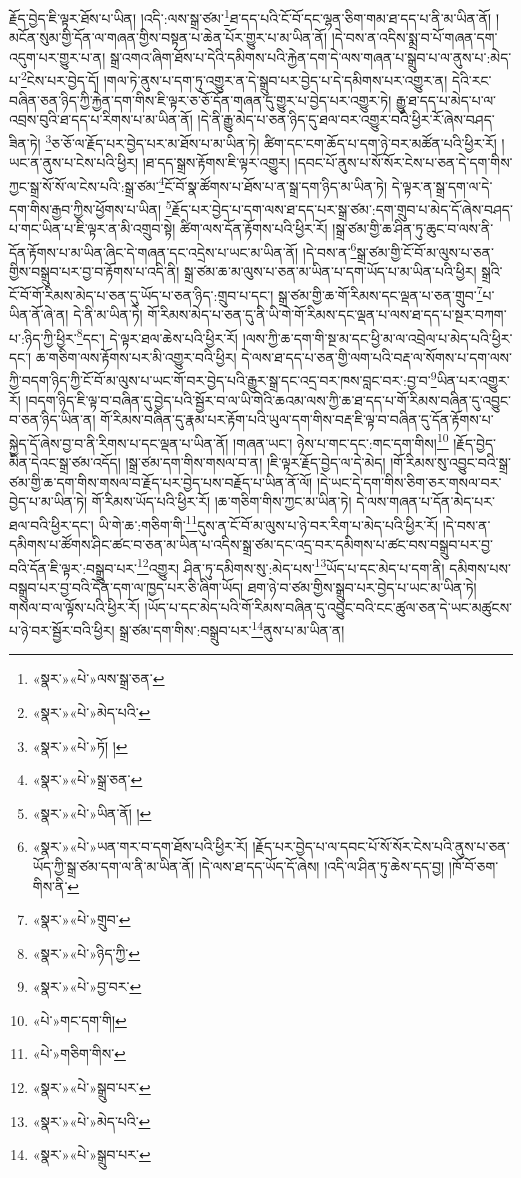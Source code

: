 རྗོད་བྱེད་ཇི་ལྟར་ཐོས་པ་ཡིན། །འདི་:ལས་སྒྲ་ཙམ་\footnote{«སྣར་»«པེ་»ལས་སྒྲ་ཅན་}ཐ་དད་པའི་ངོ་བོ་དང་ལྷན་ཅིག་གམ་ཐ་དད་པ་ནི་མ་ཡིན་ནོ། །མངོན་སུམ་གྱི་དོན་ལ་གཞན་གྱིས་བསྟན་པ་ཆེན་པོར་གྱུར་པ་མ་ཡིན་ནོ། །དེ་བས་ན་འདིས་སྨྲ་བ་པོ་གཞན་དག་འདུག་པར་གྱུར་པ་ན། སྒྲ་འགའ་ཞིག་ཐོས་པ་དེའི་དམིགས་པའི་རྐྱེན་དག་དེ་ལས་གཞན་པ་སྒྲུབ་པ་ལ་ནུས་པ་:མེད་པ་\footnote{«སྣར་»«པེ་»མེད་པའི་}ངེས་པར་བྱེད་དོ། །གལ་ཏེ་ནུས་པ་དག་ཏུ་འགྱུར་ན་དེ་སྒྲུབ་པར་བྱེད་པ་དེ་དམིགས་པར་འགྱུར་ན། དེའི་རང་བཞིན་ཅན་ཉིད་ཀྱི་རྐྱེན་དག་གིས་ཇི་ལྟར་ཅ་ཅོ་དོན་གཞན་དུ་གྱུར་པ་བྱེད་པར་འགྱུར་ཏེ། རྒྱུ་ཐ་དད་པ་མེད་པ་ལ་འབྲས་བུའི་ཐ་དད་པ་རིགས་པ་མ་ཡིན་ནོ། །དེ་ནི་རྒྱུ་མེད་པ་ཅན་ཉིད་དུ་ཐལ་བར་འགྱུར་བའི་ཕྱིར་རོ་ཞེས་བཤད་ཟིན་ཏེ། \footnote{«སྣར་»«པེ་»ཏོ། ། }ཅ་ཅོ་ལ་རྗོད་པར་བྱེད་པར་མ་ཐོས་པ་མ་ཡིན་ཏེ། ཚིག་དང་ངག་ཆོད་པ་དག་ཉེ་བར་མཚོན་པའི་ཕྱིར་རོ། །ཡང་ན་ནུས་པ་ངེས་པའི་ཕྱིར། །ཐ་དད་སྒྲས་རྟོགས་ཇི་ལྟར་འགྱུར། །དབང་པོ་ནུས་པ་སོ་སོར་ངེས་པ་ཅན་དེ་དག་གིས་ཀྱང་སྒྲ་སོ་སོ་ལ་ངེས་པའི་:སྒྲ་ཙམ་\footnote{«སྣར་»«པེ་»སྒྲ་ཅན་}ངོ་བོ་སྣ་ཚོགས་པ་ཐོས་པ་ན་སྒྲ་དག་ཉིད་མ་ཡིན་ཏེ། དེ་ལྟར་ན་སྒྲ་དག་ལ་དེ་དག་གིས་རྒྱབ་ཀྱིས་ཕྱོགས་པ་ཡིན། \footnote{«སྣར་»«པེ་»ཡིན་ནོ། ། }རྗོད་པར་བྱེད་པ་དག་ལས་ཐ་དད་པར་སྒྲ་ཙམ་:དག་གྲུབ་པ་མེད་དོ་ཞེས་བཤད་པ་གང་ཡིན་པ་ཇི་ལྟར་ན་མི་འགྲུབ་སྟེ། ཚིག་ལས་དོན་རྟོགས་པའི་ཕྱིར་རོ། །སྒྲ་ཙམ་གྱི་ཆ་ཤིན་ཏུ་ཆུང་བ་ལས་ནི་དོན་རྟོགས་པ་མ་ཡིན་ཞིང་དེ་གཞན་དང་འདྲེས་པ་ཡང་མ་ཡིན་ནོ། །དེ་བས་ན་\footnote{«སྣར་»«པེ་»ཡན་གར་བ་དག་ཐོས་པའི་ཕྱིར་རོ། །རྗོད་པར་བྱེད་པ་ལ་དབང་པོ་སོ་སོར་ངེས་པའི་ནུས་པ་ཅན་ཡོད་ཀྱི་སྒྲ་ཙམ་དག་ལ་ནི་མ་ཡིན་ནོ། །དེ་ལས་ཐ་དད་ཡོད་དོ་ཞེས། །འདི་ལ་ཤིན་ཏུ་ཆེས་དད་བྱ། །ཁོ་བོ་ཅག་གིས་ནི་}སྒྲ་ཙམ་གྱི་ངོ་བོ་མ་ལུས་པ་ཅན་གྱིས་བསྒྲུབ་པར་བྱ་བ་རྟོགས་པ་འདི་ནི། སྒྲ་ཙམ་ཆ་མ་ལུས་པ་ཅན་མ་ཡིན་པ་དག་ཡོད་པ་མ་ཡིན་པའི་ཕྱིར། སྒྲའི་ངོ་བོ་གོ་རིམས་མེད་པ་ཅན་དུ་ཡོད་པ་ཅན་ཉིད་:གྲུབ་པ་དང་། སྒྲ་ཙམ་གྱི་ཆ་གོ་རིམས་དང་ལྡན་པ་ཅན་གྲུབ་\footnote{«སྣར་»«པེ་»གྲུབ་}པ་ཡིན་ནོ་ཞེ་ན། དེ་ནི་མ་ཡིན་ཏེ། གོ་རིམས་མེད་པ་ཅན་དུ་ནི་ཡི་གེ་གོ་རིམས་དང་ལྡན་པ་ལས་ཐ་དད་པ་སྔར་བཀག་པ་:ཉིད་ཀྱི་ཕྱིར་\footnote{«སྣར་»«པེ་»ཉིད་ཀྱི་}དང་། དེ་ལྟར་ཐལ་ཆེས་པའི་ཕྱིར་རོ། །ལས་ཀྱི་ཆ་དག་གི་སྔ་མ་དང་ཕྱི་མ་ལ་འབྲེལ་པ་མེད་པའི་ཕྱིར་དང་། ཆ་གཅིག་ལས་རྟོགས་པར་མི་འགྱུར་བའི་ཕྱིར། དེ་ལས་ཐ་དད་པ་ཅན་གྱི་ལག་པའི་བརྡ་ལ་སོགས་པ་དག་ལས་ཀྱི་བདག་ཉིད་ཀྱི་ངོ་བོ་མ་ལུས་པ་ཡང་གོ་བར་བྱེད་པའི་རྒྱུར་སྒྲ་དང་འདྲ་བར་ཁས་བླང་བར་:བྱ་བ་\footnote{«སྣར་»«པེ་»བྱ་བར་}ཡིན་པར་འགྱུར་རོ། །བདག་ཉིད་ཇི་ལྟ་བ་བཞིན་དུ་བྱེད་པའི་སྦྱོར་བ་ལ་ཡི་གེའི་ཆའམ་ལས་ཀྱི་ཆ་ཐ་དད་པ་གོ་རིམས་བཞིན་དུ་འབྱུང་བ་ཅན་ཉིད་ཡིན་ན། གོ་རིམས་བཞིན་དུ་རྣམ་པར་རྟོག་པའི་ཡུལ་དག་གིས་བརྡ་ཇི་ལྟ་བ་བཞིན་དུ་དོན་རྟོགས་པ་སྐྱེད་དོ་ཞེས་བྱ་བ་ནི་རིགས་པ་དང་ལྡན་པ་ཡིན་ནོ། །གཞན་ཡང་། ཉེས་པ་གང་དང་:གང་དག་གིས།\footnote{«པེ་»གང་དག་གི།} །རྗོད་བྱེད་མིན་དེའང་སྒྲ་ཙམ་འདོད། །སྒྲ་ཙམ་དག་གིས་གསལ་བ་ན། །ཇི་ལྟར་རྗོད་བྱེད་ལ་དེ་མེད། །གོ་རིམས་སུ་འབྱུང་བའི་སྒྲ་ཙམ་གྱི་ཆ་དག་གིས་གསལ་བ་རྗོད་པར་བྱེད་པས་བརྗོད་པ་ཡིན་ནོ་ལོ། །དེ་ཡང་དེ་དག་གིས་ཅིག་ཅར་གསལ་བར་བྱེད་པ་མ་ཡིན་ཏེ། གོ་རིམས་ཡོད་པའི་ཕྱིར་རོ། །ཆ་གཅིག་གིས་ཀྱང་མ་ཡིན་ཏེ། དེ་ལས་གཞན་པ་དོན་མེད་པར་ཐལ་བའི་ཕྱིར་དང་། ཡི་གེ་ཆ་:གཅིག་གི་\footnote{«པེ་»གཅིག་གིས་}དུས་ན་ངོ་བོ་མ་ལུས་པ་ཉེ་བར་རིག་པ་མེད་པའི་ཕྱིར་རོ། །དེ་བས་ན་དམིགས་པ་ཚོགས་ཤིང་ཚང་བ་ཅན་མ་ཡིན་པ་འདིས་སྒྲ་ཙམ་དང་འདྲ་བར་དམིགས་པ་ཚང་བས་བསྒྲུབ་པར་བྱ་བའི་དོན་ཇི་ལྟར་:བསྒྲུབ་པར་\footnote{«སྣར་»«པེ་»སྒྲུབ་པར་}འགྱུར། ཤིན་ཏུ་དམིགས་སུ་:མེད་པས་\footnote{«སྣར་»«པེ་»མེད་པའི་}ཡོད་པ་དང་མེད་པ་དག་ནི། དམིགས་པས་བསྒྲུབ་པར་བྱ་བའི་དོན་དག་ལ་ཁྱད་པར་ཅི་ཞིག་ཡོད། ཐག་ཉེ་བ་ཙམ་གྱིས་སྒྲུབ་པར་བྱེད་པ་ཡང་མ་ཡིན་ཏེ། གསལ་བ་ལ་ལྟོས་པའི་ཕྱིར་རོ། །ཡོད་པ་དང་མེད་པའི་གོ་རིམས་བཞིན་དུ་འབྱུང་བའི་ངང་ཚུལ་ཅན་དེ་ཡང་མཚུངས་པ་ཉེ་བར་སྦྱོར་བའི་ཕྱིར། སྒྲ་ཙམ་དག་གིས་:བསྒྲུབ་པར་\footnote{«སྣར་»«པེ་»སྒྲུབ་པར་}ནུས་པ་མ་ཡིན་ན། 